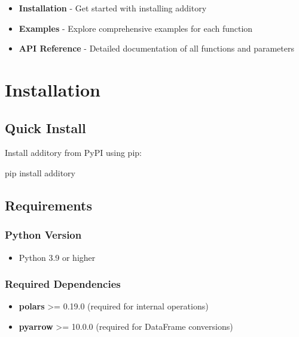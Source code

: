 \documentclass[
  letterpaper,
]{scrbook}
\newenvironment{Shaded}{\begin{snugshade}}{\end{snugshade}}
\newcommand{\ExtensionTok}[1]{\textcolor[rgb]{0.00,0.23,0.31}{#1}}
\newcommand{\NormalTok}[1]{\textcolor[rgb]{0.00,0.23,0.31}{#1}}
\providecommand{\tightlist}{%
  \setlength{\itemsep}{0pt}\setlength{\parskip}{0pt}}
\begin{document}
\begin{itemize}
\tightlist
\item
  \textbf{Installation} - Get started with installing additory
\item
  \textbf{Examples} - Explore comprehensive examples for each function
\item
  \textbf{API Reference} - Detailed documentation of all functions and
  parameters
\end{itemize}

\chapter{Installation}\label{installation-1}

\section{Quick Install}\label{quick-install}

Install additory from PyPI using pip:

\begin{Shaded}
\begin{Highlighting}[]
\ExtensionTok{pip}\NormalTok{ install additory}
\end{Highlighting}
\end{Shaded}

\section{Requirements}\label{requirements}

\subsection{Python Version}\label{python-version}

\begin{itemize}
\tightlist
\item
  Python 3.9 or higher
\end{itemize}

\subsection{Required Dependencies}\label{required-dependencies}

\begin{itemize}
\tightlist
\item
  \textbf{polars} \textgreater= 0.19.0 (required for internal
  operations)
\item
  \textbf{pyarrow} \textgreater= 10.0.0 (required for DataFrame
  conversions)
\end{itemize}
\end{document}
